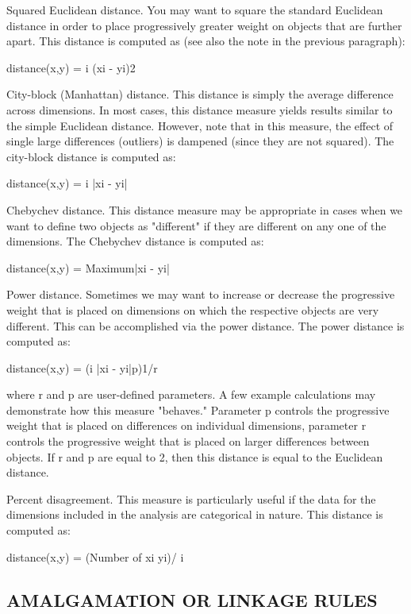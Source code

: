 Squared Euclidean distance. You may want to square the standard Euclidean distance in order to place progressively greater weight on objects that are further apart. This distance is computed as (see also the note in the previous paragraph):

distance(x,y) = i (xi - yi)2

City-block (Manhattan) distance. This distance is simply the average difference across dimensions. In most cases, this distance measure yields results similar to the simple Euclidean distance. However, note that in this measure, the effect of single large differences (outliers) is dampened (since they are not squared). The city-block distance is computed as:

distance(x,y) = i |xi - yi|

Chebychev distance. This distance measure may be appropriate in cases when we want to define two objects as "different" if they are different on any one of the dimensions. The Chebychev distance is computed as:

distance(x,y) = Maximum|xi - yi|

Power distance. Sometimes we may want to increase or decrease the progressive weight that is placed on dimensions on which the respective objects are very different. This can be accomplished via the power distance. The power distance is computed as:

distance(x,y) = (i |xi - yi|p)1/r

where r and p are user-defined parameters. A few example calculations may demonstrate how this measure "behaves." Parameter p controls the progressive weight that is placed on differences on individual dimensions, parameter r controls the progressive weight that is placed on larger differences between objects. If r and p are equal to 2, then this distance is equal to the Euclidean distance.

Percent disagreement. This measure is particularly useful if the data for the dimensions included in the analysis are categorical in nature. This distance is computed as:

distance(x,y) = (Number of xi  yi)/ i

\subsection*{AMALGAMATION OR LINKAGE RULES}

